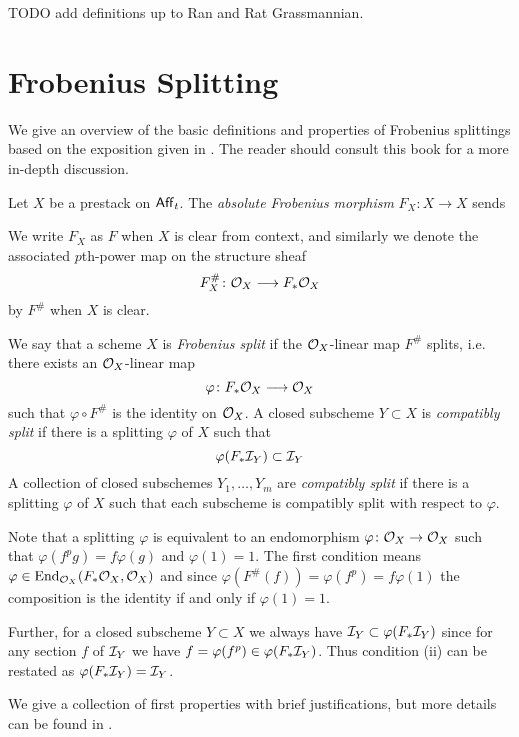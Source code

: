 \documentclass[12pt]{article}
\begin{document}
TODO add definitions up to Ran and Rat Grassmannian.

\section{Frobenius Splitting}\label{frobsplit}

We give an overview of the basic definitions and properties of Frobenius splittings based on the exposition given in \cite{Brion2004FrobeniusSM}. The reader should consult this book for a more in-depth discussion.

\begin{defn}
    Let $X$ be a prestack on $\operatorname{\mathsf{Aff}}_t$. The \textit{absolute Frobenius morphism} $F_X \colon X \longrightarrow X$ sends 
\end{defn}

We write $F_X$ as $F$ when $X$ is clear from context, and similarly we denote the associated $p$th-power map on the structure sheaf
\[F^{\#}_X \colon \mathcal{O}_X \longrightarrow F_* \mathcal{O}_X\]
by $F^{\#}$ when $X$ is clear.

\begin{defn} We say that a scheme $X$ is \textit{Frobenius split} if the $\mathcal{O}_X$-linear map $F^{\#}$ splits, i.e. there exists an $\mathcal{O}_X$-linear map
    \[\varphi \colon F_* \mathcal{O}_X \longrightarrow \mathcal{O}_X\]
    such that $\varphi \circ F^{\#} $ is the identity on $\mathcal{O}_X$. A closed subscheme $Y \subset X$ is \textit{compatibly split} if there is a splitting $\varphi$ of $X$ such that 
    \[\varphi(F_* \mathcal{I}_Y) \subset \mathcal{I}_Y\]
    A collection of closed subschemes $Y_1,\ldots,Y_m$ are \textit{compatibly split} if there is a splitting $\varphi$ of $X$ such that each subscheme is compatibly split with respect to $\varphi$.
\end{defn}
Note that a splitting $\varphi$ is equivalent to an endomorphism $\varphi \colon \mathcal{O}_X \to \mathcal{O}_X$ such that $\varphi(f^p g) = f \varphi(g)$ and $\varphi(1) = 1$. The first condition means $\varphi \in \operatorname{End}_{\mathcal{O}_X}(F_* \mathcal{O}_X, \mathcal{O}_X)$ and since $\varphi(F^{\#}(f)) = \varphi(f^p) = f\varphi(1)$ the composition is the identity if and only if $\varphi(1) = 1$.

    Further, for a closed subscheme $Y \subset X$ we always have $\mathcal{I}_Y \subset \varphi(F_* \mathcal{I}_Y)$ since for any section $f$ of $\mathcal{I}_Y$ we have $f = \varphi(f^p) \in \varphi(F_*\mathcal{I}_Y)$. Thus condition (ii) can be restated as $\varphi(F_* \mathcal{I}_Y) = \mathcal{I}_Y$.

    We give a collection of first properties with brief justifications, but more details can be found in \cite{Brion2004FrobeniusSM}.
\end{document}
